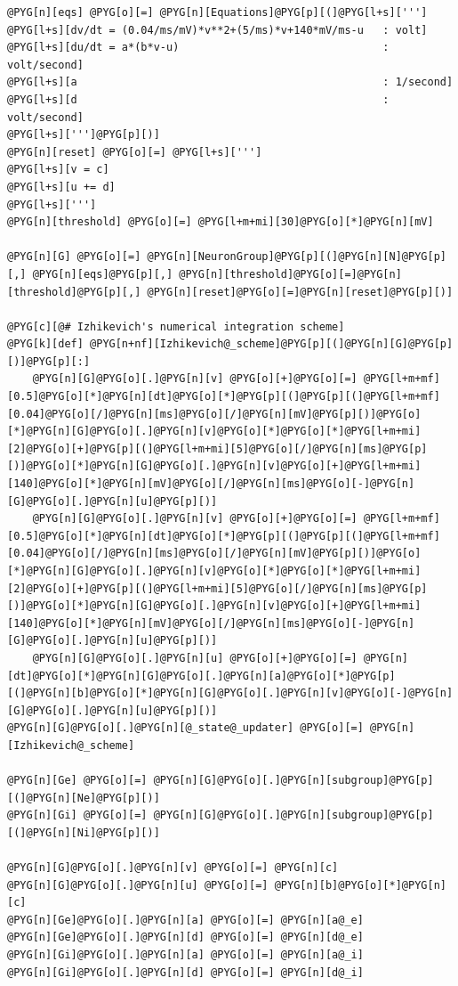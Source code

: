 \documentclass[letterpaper,10pt,english]{manual}
\begin{document}
\begin{Verbatim}[commandchars=@\[\]]
@PYG[n][eqs] @PYG[o][=] @PYG[n][Equations]@PYG[p][(]@PYG[l+s][''']
@PYG[l+s][dv/dt = (0.04/ms/mV)*v**2+(5/ms)*v+140*mV/ms-u   : volt]
@PYG[l+s][du/dt = a*(b*v-u)                                : volt/second]
@PYG[l+s][a                                                : 1/second]
@PYG[l+s][d                                                : volt/second]
@PYG[l+s][''']@PYG[p][)]
@PYG[n][reset] @PYG[o][=] @PYG[l+s][''']
@PYG[l+s][v = c]
@PYG[l+s][u += d]
@PYG[l+s][''']
@PYG[n][threshold] @PYG[o][=] @PYG[l+m+mi][30]@PYG[o][*]@PYG[n][mV]

@PYG[n][G] @PYG[o][=] @PYG[n][NeuronGroup]@PYG[p][(]@PYG[n][N]@PYG[p][,] @PYG[n][eqs]@PYG[p][,] @PYG[n][threshold]@PYG[o][=]@PYG[n][threshold]@PYG[p][,] @PYG[n][reset]@PYG[o][=]@PYG[n][reset]@PYG[p][)]

@PYG[c][@# Izhikevich's numerical integration scheme]
@PYG[k][def] @PYG[n+nf][Izhikevich@_scheme]@PYG[p][(]@PYG[n][G]@PYG[p][)]@PYG[p][:]
    @PYG[n][G]@PYG[o][.]@PYG[n][v] @PYG[o][+]@PYG[o][=] @PYG[l+m+mf][0.5]@PYG[o][*]@PYG[n][dt]@PYG[o][*]@PYG[p][(]@PYG[p][(]@PYG[l+m+mf][0.04]@PYG[o][/]@PYG[n][ms]@PYG[o][/]@PYG[n][mV]@PYG[p][)]@PYG[o][*]@PYG[n][G]@PYG[o][.]@PYG[n][v]@PYG[o][*]@PYG[o][*]@PYG[l+m+mi][2]@PYG[o][+]@PYG[p][(]@PYG[l+m+mi][5]@PYG[o][/]@PYG[n][ms]@PYG[p][)]@PYG[o][*]@PYG[n][G]@PYG[o][.]@PYG[n][v]@PYG[o][+]@PYG[l+m+mi][140]@PYG[o][*]@PYG[n][mV]@PYG[o][/]@PYG[n][ms]@PYG[o][-]@PYG[n][G]@PYG[o][.]@PYG[n][u]@PYG[p][)]
    @PYG[n][G]@PYG[o][.]@PYG[n][v] @PYG[o][+]@PYG[o][=] @PYG[l+m+mf][0.5]@PYG[o][*]@PYG[n][dt]@PYG[o][*]@PYG[p][(]@PYG[p][(]@PYG[l+m+mf][0.04]@PYG[o][/]@PYG[n][ms]@PYG[o][/]@PYG[n][mV]@PYG[p][)]@PYG[o][*]@PYG[n][G]@PYG[o][.]@PYG[n][v]@PYG[o][*]@PYG[o][*]@PYG[l+m+mi][2]@PYG[o][+]@PYG[p][(]@PYG[l+m+mi][5]@PYG[o][/]@PYG[n][ms]@PYG[p][)]@PYG[o][*]@PYG[n][G]@PYG[o][.]@PYG[n][v]@PYG[o][+]@PYG[l+m+mi][140]@PYG[o][*]@PYG[n][mV]@PYG[o][/]@PYG[n][ms]@PYG[o][-]@PYG[n][G]@PYG[o][.]@PYG[n][u]@PYG[p][)]
    @PYG[n][G]@PYG[o][.]@PYG[n][u] @PYG[o][+]@PYG[o][=] @PYG[n][dt]@PYG[o][*]@PYG[n][G]@PYG[o][.]@PYG[n][a]@PYG[o][*]@PYG[p][(]@PYG[n][b]@PYG[o][*]@PYG[n][G]@PYG[o][.]@PYG[n][v]@PYG[o][-]@PYG[n][G]@PYG[o][.]@PYG[n][u]@PYG[p][)]
@PYG[n][G]@PYG[o][.]@PYG[n][@_state@_updater] @PYG[o][=] @PYG[n][Izhikevich@_scheme]

@PYG[n][Ge] @PYG[o][=] @PYG[n][G]@PYG[o][.]@PYG[n][subgroup]@PYG[p][(]@PYG[n][Ne]@PYG[p][)]
@PYG[n][Gi] @PYG[o][=] @PYG[n][G]@PYG[o][.]@PYG[n][subgroup]@PYG[p][(]@PYG[n][Ni]@PYG[p][)]

@PYG[n][G]@PYG[o][.]@PYG[n][v] @PYG[o][=] @PYG[n][c]
@PYG[n][G]@PYG[o][.]@PYG[n][u] @PYG[o][=] @PYG[n][b]@PYG[o][*]@PYG[n][c]
@PYG[n][Ge]@PYG[o][.]@PYG[n][a] @PYG[o][=] @PYG[n][a@_e]
@PYG[n][Ge]@PYG[o][.]@PYG[n][d] @PYG[o][=] @PYG[n][d@_e]
@PYG[n][Gi]@PYG[o][.]@PYG[n][a] @PYG[o][=] @PYG[n][a@_i]
@PYG[n][Gi]@PYG[o][.]@PYG[n][d] @PYG[o][=] @PYG[n][d@_i]


\end{Verbatim}
\end{document}
